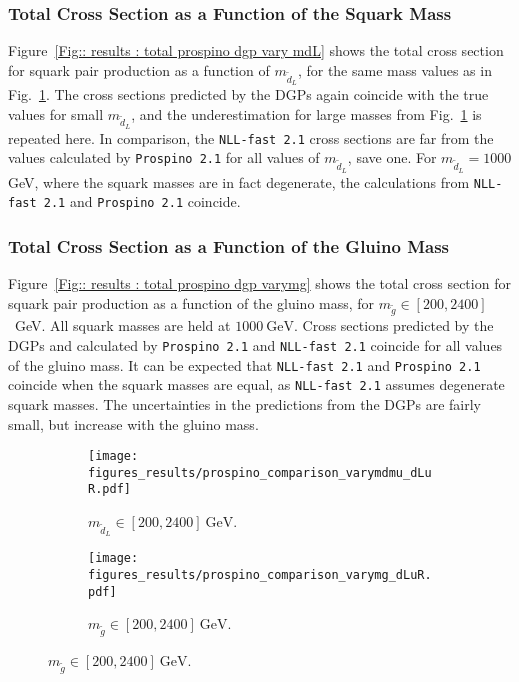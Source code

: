 \documentclass[twoside,english]{uiofysmaster}
\begin{document}
{{\subsubsection{Total Cross Section as a Function of the Squark Mass}

Figure~\ref{Fig:: results : total prospino dgp vary mdL} shows the total cross section for squark pair production as a function of $m_{\widetilde{d}_L}$, for the same mass values as in Fig.~\ref{Fig:: results : dLuL uLuL prospino dgp}. The cross sections predicted by the DGPs again coincide with the true values for small $m_{\widetilde{d}_L}$, and the underestimation for large masses from Fig.~\ref{Fig:: results : dLuL uLuL prospino dgp} is repeated here. In comparison, the \verb|NLL-fast 2.1| cross sections are far from the values calculated by \verb|Prospino 2.1| for all values of $m_{\widetilde{d}_L}$, save one. For $m_{\widetilde{d}_L}=1000$ GeV, where the squark masses are in fact degenerate, the calculations from \verb|NLL-fast 2.1| and \verb|Prospino 2.1| coincide.  

\subsubsection{Total Cross Section as a Function of the Gluino Mass}

Figure~\ref{Fig:: results : total prospino dgp varymg} shows the total cross section for squark pair production as a function of the gluino mass, for $m_{\widetilde{g}} \in [200, 2400]$~GeV. All squark masses are held at $1000~\mathrm{GeV}$. Cross sections predicted by the DGPs and calculated by \verb|Prospino 2.1| and \verb|NLL-fast 2.1| coincide for all values of the gluino mass. It can be expected that \verb|NLL-fast 2.1| and \verb|Prospino 2.1| coincide when the squark masses are equal, as \verb|NLL-fast 2.1| assumes degenerate squark masses. The uncertainties in the predictions from the DGPs are fairly small, but increase with the gluino mass. 




\begin{figure}
    \centering
    \begin{subfigure}[b]{0.9\textwidth}
        \texttt{[image: figures\_results/prospino\_comparison\_varymdmu\_dLuR.pdf]}
\caption{$m_{\widetilde{d}_L} \in[200, 2400]~\mathrm{GeV}$.}
\label{Fig:: results : dLuL uLuL prospino dgp}
    \end{subfigure}

    \begin{subfigure}[b]{0.9\textwidth}
    \centering
        \texttt{[image: figures\_results/prospino\_comparison\_varymg\_dLuR.pdf]}
\caption{$m_{\widetilde{g}}\in[200, 2400]~\mathrm{GeV}$.}
\label{Fig:: results : dLuL uLuL prospino dgp varymg}
    \end{subfigure}


\end{figure}}}
\end{document}
